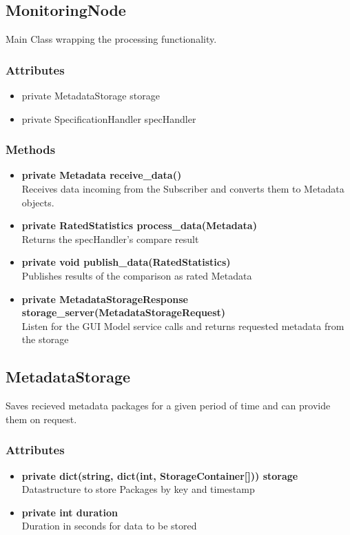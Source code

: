 
\subsection{MonitoringNode}
Main Class wrapping the processing functionality.

\subsubsection{Attributes}
\begin{itemize}
	\item private MetadataStorage storage
	\item private SpecificationHandler specHandler
\end{itemize}
\subsubsection{Methods}
\begin{itemize}
	\item \textbf{private Metadata receive\_data()}\\
	Receives data incoming from the Subscriber and converts them to Metadata objects.
	\item \textbf{private RatedStatistics process\_data(Metadata)}\\
	Returns the specHandler's compare result
	\item \textbf{private void publish\_data(RatedStatistics)}\\
	Publishes results of the comparison as rated Metadata
	\item \textbf{private MetadataStorageResponse storage\_server(MetadataStorageRequest)}\\
	Listen for the GUI Model service calls and returns requested metadata from the storage
\end{itemize}


\subsection{MetadataStorage}
Saves recieved metadata packages for a given period of time and can provide them on request.

\subsubsection{Attributes}
\begin{itemize}
	\item \textbf{private dict(string, dict(int, StorageContainer[])) storage}\\
	Datastructure to store Packages by key and timestamp
	\item \textbf{private int duration}\\
	Duration in seconds for data to be stored
\end{itemize}
